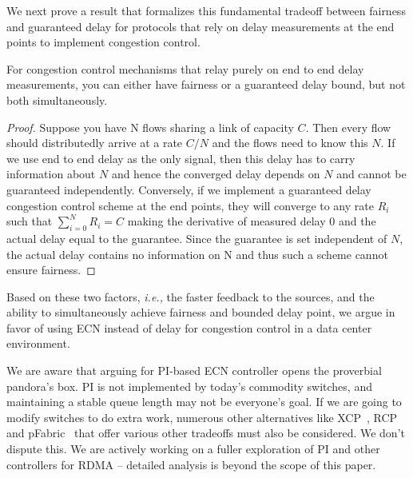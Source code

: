 We next prove a result that formalizes this fundamental tradeoff between fairness
and guaranteed delay for protocols that rely on delay measurements at the end
points to implement congestion control.

\begin{thm}
\label{thm:fairness-delay}
For congestion control mechanisms that relay purely on end to end
delay measurements, you can either have fairness or a guaranteed delay
bound, but not both simultaneously.
\end{thm}
\begin{proof}
Suppose you have N flows sharing a link of capacity $C$. Then every flow
should distributedly arrive at a rate $C/N$ and the flows need to know
this $N$. If we use end to end delay as the only signal, then this delay
has to carry information about $N$ and hence the converged delay
depends on $N$ and cannot be guaranteed independently. Conversely, if we implement a guaranteed delay congestion
control scheme at the end points, they
will converge to any rate $R_i$ such that $\sum_{i=0}^{N}R_i = C$
making the derivative of measured delay 0 and the actual delay equal
to the guarantee. Since the guarantee is set independent of $N$, the
actual delay contains no information on N and 
thus such a scheme cannot ensure fairness.
\end{proof}

Based on these two factors, {\em i.e.,} the faster feedback to the sources, and
the ability to simultaneously achieve fairness and bounded delay point, we argue
in favor of using ECN instead of delay for congestion control in a data center
environment.

We are aware that arguing for PI-based ECN controller opens the proverbial
pandora's box. PI is not implemented by today's commodity switches, and
maintaining a stable queue length may not be everyone's goal. If we are going to
modify switches to do extra work, numerous other alternatives like
XCP~\cite{katabi2002congestion}, RCP~\cite{rcp} and pFabric~\cite{pfabric} that
offer various other tradeoffs must also be considered. We don't dispute this.
We are actively working on a fuller exploration of PI and other controllers for
RDMA -- detailed analysis is beyond the scope of this paper.
